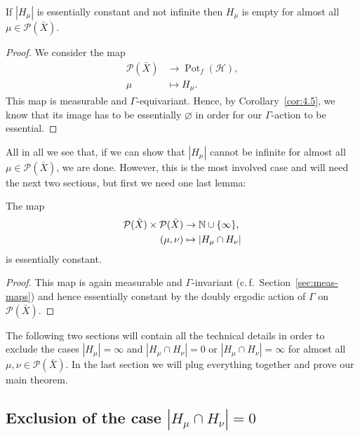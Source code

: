 \begin{lemma}
  \label{lem:finite-zero}
  If \(|H_\mu|\) is essentially constant and not infinite then \(H_\mu\) is empty for almost all \(\mu \in \mathcal{P}(\bar X)\).
\end{lemma}

\begin{proof}
  We consider the map
  \begin{align*}
    \mathcal{P}(\bar X) & \to \operatorname{Pot}_f(\mathcal{H}),\\
    \mu & \mapsto H_\mu.
  \end{align*}
  This map is measurable and \(\Gamma\)-equivariant. Hence, by Corollary~\ref{cor:4.5}, we know that its image has to be essentially \(\varnothing\) in order for our \(\Gamma\)-action to be essential.
\end{proof}

All in all we see that, if we can show that \(|H_\mu|\) cannot be infinite for almost all \(\mu \in \mathcal{P}(\bar X)\), we are done. However, this is the most involved case and will need the next two sections, but first we need one last lemma:

\begin{lemma}
  \label{lem:hh-const}
  The map
  \begin{align*}
    \mathcal{P}(\bar X) \times \mathcal{P}(\bar X) &\to \mathbb{N} \cup \{\infty\},\\
    (\mu, \nu) &\mapsto |H_\mu \cap H_\nu|
  \end{align*}
  is essentially constant.
\end{lemma}

\begin{proof}
  This map is again measurable and \(\Gamma\)-invariant (c.\,f.~Section~\ref{sec:meas-maps}) and hence essentially constant by the doubly ergodic action of \(\Gamma\) on \(\mathcal{P}(\bar X)\).
\end{proof}

The following two sections will contain all the technical details in order to exclude the cases \(|H_\mu| = \infty\) and \(|H_\mu \cap H_\nu| = 0\) or \(|H_\mu \cap H_\nu| = \infty\) for almost all \(\mu, \nu \in \mathcal{P}(\bar X)\). In the last section we will plug everything together and prove our main theorem.

\subsection{Exclusion of the case \(|H_\mu \cap H_\nu| = 0\)}
\label{sec:M=0}

